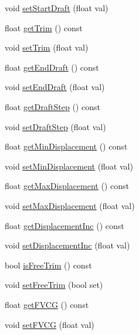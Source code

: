 \begin{DoxyCompactItemize}
void \hyperlink{classShipCAD_1_1ProjectSettings_a9e389573e2266b099f49452d68edf24f}{set\+Start\+Draft} (float val)
\item 
float \hyperlink{classShipCAD_1_1ProjectSettings_ae33d385390ea594e9bb68527048d5c07}{get\+Trim} () const 
\item 
void \hyperlink{classShipCAD_1_1ProjectSettings_afdab155f3ca324b3c200a97c9ade1ff6}{set\+Trim} (float val)
\item 
float \hyperlink{classShipCAD_1_1ProjectSettings_a954340a0f5e756c3aff81868249a222d}{get\+End\+Draft} () const 
\item 
void \hyperlink{classShipCAD_1_1ProjectSettings_a45e70a08ac47cdf30971a7386af702a9}{set\+End\+Draft} (float val)
\item 
float \hyperlink{classShipCAD_1_1ProjectSettings_a3f46eaa983b4c1ae7407ba86da7f3790}{get\+Draft\+Step} () const 
\item 
void \hyperlink{classShipCAD_1_1ProjectSettings_a45081194c5e105780429b0f214bab186}{set\+Draft\+Step} (float val)
\item 
float \hyperlink{classShipCAD_1_1ProjectSettings_ab0d5ec3189effe4853276ec7efe95d8d}{get\+Min\+Displacement} () const 
\item 
void \hyperlink{classShipCAD_1_1ProjectSettings_a0373ae36b33e407411374380467681c3}{set\+Min\+Displacement} (float val)
\item 
float \hyperlink{classShipCAD_1_1ProjectSettings_a1c21c304fef2cacea560a746d30f60f1}{get\+Max\+Displacement} () const 
\item 
void \hyperlink{classShipCAD_1_1ProjectSettings_ae2dd65c477d50ffa78f06e12870ddf29}{set\+Max\+Displacement} (float val)
\item 
float \hyperlink{classShipCAD_1_1ProjectSettings_afcd0637afccc5b76e12b7a5617eefa47}{get\+Displacement\+Inc} () const 
\item 
void \hyperlink{classShipCAD_1_1ProjectSettings_ad9bc7e466fd0605491322e12164dd70a}{set\+Displacement\+Inc} (float val)
\item 
bool \hyperlink{classShipCAD_1_1ProjectSettings_a7960059048eb46b102eab8bbc16720f4}{is\+Free\+Trim} () const 
\item 
void \hyperlink{classShipCAD_1_1ProjectSettings_a2eb888ab8a0a4d638c6454779203ac7b}{set\+Free\+Trim} (bool set)
\item 
float \hyperlink{classShipCAD_1_1ProjectSettings_aa514774176827961d2bde76c53d7b01a}{get\+F\+V\+CG} () const 
\item 
void \hyperlink{classShipCAD_1_1ProjectSettings_a2c784a62e8b44d0f8ceb292ca2480a02}{set\+F\+V\+CG} (float val)

\end{DoxyCompactItemize}
